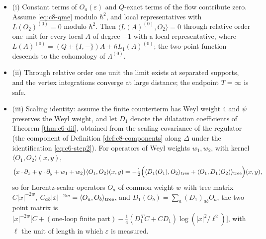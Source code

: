 \begin{proposition}
\label{prop:c8-2pt}
\begin{itemize}
\item (i) Constant terms of $O_a(\varepsilon)$ and $Q$-exact terms of the flow contribute zero. Assume \eqref{eq:c8-qme} modulo $\hbar^2$, and local representatives with $L(O_2)^{(0)}=0$ modulo $\hbar^2$. Then $\langle L(A)^{(0)},O_2\rangle=0$ through relative order one unit for every local $A$ of degree $-1$ with a local representative, where $L(A)^{(0)}=(Q+\{I,-\})A+\hbar L_1(A)^{(0)}$; the two-point function descends to the cohomology of $\Lambda^{(0)}$.
\item (ii) Through relative order one unit the limit exists at separated supports, and the vertex integrations converge at large distance; the endpoint $T=\infty$ is safe.
\item (iii) Scaling identity: assume the finite counterterm has Weyl weight $4$ and $\psi$ preserves the Weyl weight, and let $D_1$ denote the dilatation coefficients of Theorem \ref{thm:c6-dil}, obtained from the scaling covariance of the regulator (the component of Definition \ref{def:c8-components} along $\Delta$ under the identification \eqref{eq:c6-step2}). For operators of Weyl weights $w_1,w_2$, with kernel $\langle O_1,O_2\rangle(x,y)$,
\[
\big(x\cdot\partial_x+y\cdot\partial_y+w_1+w_2\big)\langle O_1,O_2\rangle(x,y)=-\tfrac12\Big(\langle D_1(O_1),O_2\rangle_{\rm tree}+\langle O_1,D_1(O_2)\rangle_{\rm tree}\Big)(x,y),
\]
so for Lorentz-scalar operators $O_a$ of common weight $w$ with tree matrix $C|x|^{-2w}$, $C_{ab}|x|^{-2w}=\langle O_a,O_b\rangle_{\rm tree}$, and $D_1(O_b)=\sum_a(D_1)_{ab}O_a$, the two-point matrix is $|x|^{-2w}\big[C+(\text{one-loop finite part})-\tfrac14(D_1^{\,T}C+CD_1)\log(|x|^2/\ell^2)\big]$, with $\ell$ the unit of length in which $\varepsilon$ is measured.
\end{itemize}
\end{proposition}

